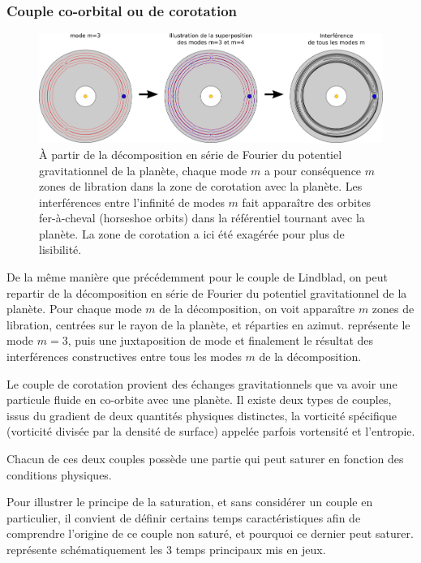 \subsubsection{Couple co-orbital ou de corotation}\label{sec:couple-corotation}
\begin{figure}[htbp]
\centering
\includegraphics[width=\linewidth]{figure/corotation_modes.pdf}
\caption{À partir de la décomposition en série de Fourier du potentiel gravitationnel de la planète, chaque mode $m$ a pour conséquence $m$ zones de libration dans la zone de corotation avec la planète. Les interférences entre l'infinité de modes $m$ fait apparaître des orbites fer-à-cheval (\og horseshoe orbits\fg) dans la référentiel tournant avec la planète. La zone de corotation a ici été exagérée pour plus de lisibilité.}\label{fig:corotation_torque}
\end{figure}

De la même manière que précédemment pour le couple de Lindblad, on peut repartir de la décomposition en série de Fourier du potentiel gravitationnel de la planète. Pour chaque mode $m$ de la décomposition, on voit apparaître $m$ zones de libration, centrées sur le rayon de la planète, et réparties en azimut.  représente le mode $m=3$, puis une juxtaposition de mode et finalement le résultat des interférences constructives entre tous les modes $m$ de la décomposition.


Le couple de corotation provient des échanges gravitationnels que va avoir une particule fluide en co-orbite avec une planète. Il existe deux types de couples, issus du gradient de deux quantités physiques distinctes, la vorticité spécifique (vorticité divisée par la densité de surface) appelée parfois vortensité et l'entropie. 

Chacun de ces deux couples possède une partie qui peut saturer en fonction des conditions physiques. 

Pour illustrer le principe de la saturation, et sans considérer un couple en particulier, il convient de définir certains temps caractéristiques afin de comprendre l'origine de ce couple non saturé, et pourquoi ce dernier peut saturer.  représente schématiquement les 3 temps principaux mis en jeux. 

